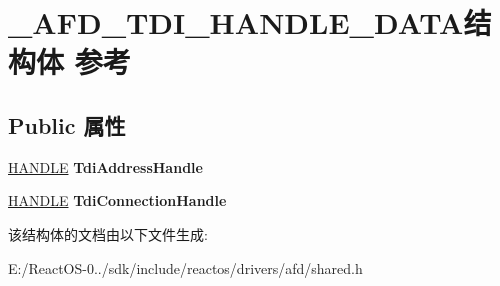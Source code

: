 \hypertarget{struct___a_f_d___t_d_i___h_a_n_d_l_e___d_a_t_a}{}\section{\+\_\+\+A\+F\+D\+\_\+\+T\+D\+I\+\_\+\+H\+A\+N\+D\+L\+E\+\_\+\+D\+A\+T\+A结构体 参考}
\label{struct___a_f_d___t_d_i___h_a_n_d_l_e___d_a_t_a}
\subsection*{Public 属性}
\begin{DoxyCompactItemize}
\item 
\mbox{\label{struct___a_f_d___t_d_i___h_a_n_d_l_e___d_a_t_a_acd016dfd7ddf40505d21f17499ba6d64}} 
\hyperlink{interfacevoid}{H\+A\+N\+D\+LE} {\bfseries Tdi\+Address\+Handle}
\item 
\mbox{\label{struct___a_f_d___t_d_i___h_a_n_d_l_e___d_a_t_a_ab0a2142bf4d0671447673723eee31215}} 
\hyperlink{interfacevoid}{H\+A\+N\+D\+LE} {\bfseries Tdi\+Connection\+Handle}
\end{DoxyCompactItemize}


该结构体的文档由以下文件生成\+:\begin{DoxyCompactItemize}
\item 
E\+:/\+React\+O\+S-\/0../sdk/include/reactos/drivers/afd/shared.\+h\end{DoxyCompactItemize}
